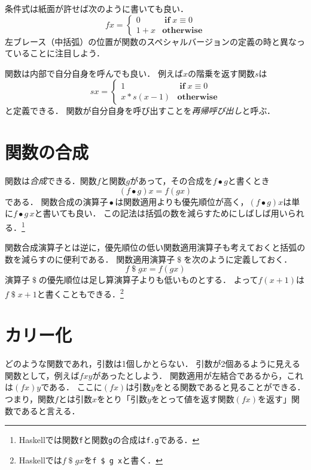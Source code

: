 \documentclass[twocolumn]{jsbook}
\newcommand{\keyword}[1]{\emph{#1}}
\newcommand{\code}[1]{\texttt{#1}}
\newcommand{\mathKeyword}[1]{\mathbf{#1}}
\DeclareMathOperator{\mathApply}{\$}
\DeclareMathOperator{\mathCompose}{\bullet}
\DeclareMathOperator{\mathIf}{\mathKeyword{if}}
\newcommand{\mathOtherwise}{\mathKeyword{otherwise}}
\begin{document}
条件式は紙面が許せば次のように書いても良い．
\begin{equation*}
fx=\begin{cases}
0&\mathIf x\equiv0\\
1+x&\mathOtherwise
\end{cases}
\end{equation*}
左ブレース（中括弧）の位置が関数のスペシャルバージョンの定義の時と異なっていることに注目しよう．

関数は内部で自分自身を呼んでも良い．
例えば$x$の階乗を返す関数$s$は
\begin{equation*}
sx=\begin{cases}
1&\mathIf x\equiv0\\
x*s(x-1)&\mathOtherwise
\end{cases}
\end{equation*}
と定義できる．
関数が自分自身を呼び出すことを\keyword{再帰呼び出し}と呼ぶ．

\section{関数の合成}

関数は\keyword{合成}できる．関数$f$と関数$g$があって，その合成を$f\mathCompose g$と書くとき$$(f\mathCompose g)x=f(gx)$$である．
関数合成の演算子$\mathCompose$は関数適用よりも優先順位が高く，$(f\mathCompose g)x$は単に$f\mathCompose g\,x$と書いても良い．
この記法は括弧の数を減らすためにしばしば用いられる．\footnote{Haskellでは関数\code{f}と関数\code{g}の合成は\code{f.g}である．}

関数合成演算子とは逆に，優先順位の低い関数適用演算子も考えておくと括弧の数を減らすのに便利である．
関数適用演算子$\mathApply$を次のように定義しておく．
$$f\mathApply gx=f(gx)$$
演算子$\mathApply$の優先順位は足し算演算子よりも低いものとする．
よって$f(x+1)$は$f\mathApply x+1$と書くこともできる．\footnote{Haskellでは$f\mathApply gx$を\code{f \$ g x}と書く．}

\section{カリー化}

どのような関数であれ，引数は1個しかとらない．
引数が2個あるように見える関数として，例えば$fxy$があったとしよう．
関数適用が左結合であるから，これは$(fx)y$である．
ここに$(fx)$は引数$y$をとる関数であると見ることができる．
つまり，関数$f$とは引数$x$をとり「引数$y$をとって値を返す関数$(fx)$を返す」関数であると言える．
\end{document}
